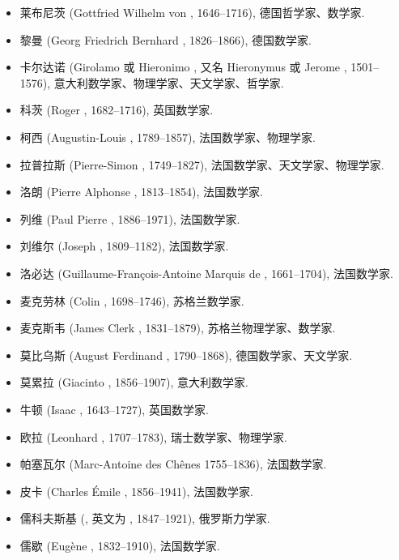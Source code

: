 \begin{itemize}
  \item 莱布尼茨 (Gottfried Wilhelm von , 1646--1716), 德国哲学家、数学家.
  \item 黎曼 (Georg Friedrich Bernhard , 1826--1866), 德国数学家.
  \item 卡尔达诺 (Girolamo 或 Hieronimo , 又名 Hieronymus  或 Jerome , 1501--1576), 意大利数学家、物理学家、天文学家、哲学家.
  \item 科茨 (Roger , 1682--1716), 英国数学家.
  \item 柯西 (Augustin-Louis , 1789--1857), 法国数学家、物理学家.
  \item 拉普拉斯 (Pierre-Simon , 1749--1827), 法国数学家、天文学家、物理学家.
  \item 洛朗 (Pierre Alphonse , 1813--1854), 法国数学家.
  \item 列维 (Paul Pierre , 1886--1971), 法国数学家.
  \item 刘维尔 (Joseph , 1809--1182), 法国数学家.
  \item 洛必达 (Guillaume-François-Antoine Marquis de , 1661--1704), 法国数学家.
  \item 麦克劳林 (Colin , 1698--1746), 苏格兰数学家.
  \item 麦克斯韦 (James Clerk , 1831--1879), 苏格兰物理学家、数学家.
  \item 莫比乌斯 (August Ferdinand , 1790--1868), 德国数学家、天文学家.
  \item 莫累拉 (Giacinto , 1856--1907), 意大利数学家.
  \item 牛顿 (Isaac , 1643--1727), 英国数学家.
  \item 欧拉 (Leonhard , 1707--1783), 瑞士数学家、物理学家.
  \item 帕塞瓦尔 (Marc-Antoine  des Chênes 1755--1836), 法国数学家.
  \item 皮卡 (Charles Émile , 1856--1941), 法国数学家.
  \item 儒科夫斯基 (, 英文为 , 1847--1921), 俄罗斯力学家.
  \item 儒歇 (Eugène , 1832--1910), 法国数学家.

\end{itemize}
